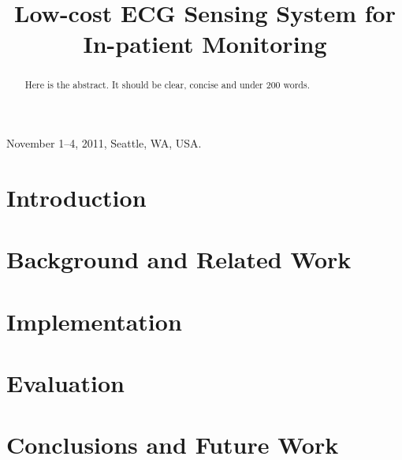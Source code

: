 \documentclass[10pt]{sigplan-proc-varsize-sensys11}
\begin{document}
\title{Low-cost ECG Sensing System for In-patient Monitoring}
\author{
}

 {November 1--4, 2011, Seattle, WA, USA.}

\maketitle

\begin{abstract}
Here is the abstract. It should be clear, concise and under 200 words.

\end{abstract}


\section{Introduction}
\label{sec:intro}


\section{Background and Related Work}
\label{sec:related}


\section{Implementation}
\label{sec:implementation}


\section{Evaluation}
\label{sec:eval}


\section{Conclusions and Future Work}
\label{sec:conclusion}


{\footnotesize


}
\end{document}

